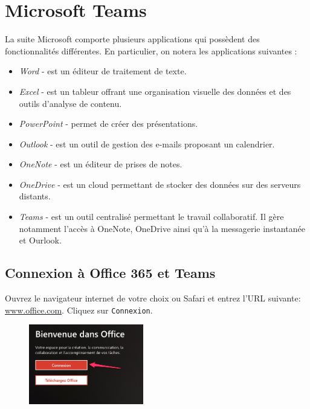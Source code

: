 \chapter{Microsoft Teams}\label{teams1}  


La suite Microsoft comporte plusieurs applications qui possèdent des fonctionnalités différentes. En particulier, on notera les applications suivantes :\\

\begin{itemize}
\item \textit{Word} - est un éditeur de traitement de texte.
\item \textit{Excel} - est un tableur offrant une organisation visuelle des données et des outils d'analyse de contenu.
\item \textit{PowerPoint} - permet de créer des présentations.
\item \textit{Outlook} - est un outil de gestion des e-mails proposant un calendrier.
\item \textit{OneNote} - est un éditeur de prises de notes.
\item \textit{OneDrive} - est un cloud permettant de stocker des données sur des serveurs distants.
\item \textit{Teams} - est un outil centralisé permettant le travail collaboratif. Il gère notamment l'accès à OneNote, OneDrive ainsi qu'à la messagerie instantanée et Ourlook.
\end{itemize} 


\section{Connexion à Office 365 et Teams}

Ouvrez le navigateur internet de votre choix ou Safari et entrez l'URL suivante: \url{www.office.com}. Cliquez sur \texttt{Connexion}.

\begin{figure}[H]
\includegraphics[width=5cm]{./images/teams/ecran_office_com_crop}
\centering
\end{figure}

